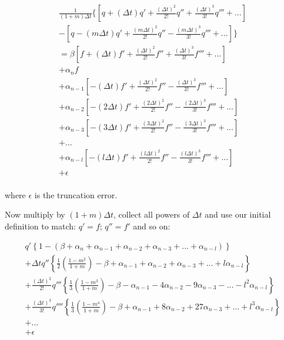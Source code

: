 \begin{multline}
\frac{1}{(1+m) \Delta t}
       \{ \left[ q +     ( \Delta t) q' +  \frac{( \Delta t)^2}    {2!} q'' +  \frac{(    \Delta t)^3}{3!} q''' + ... \right] \\
	- \left[ q - (m \Delta t) q'  + \frac{(m \Delta t)^2}{2!} q'' -    \frac{(m \Delta t)^3}{3!} q'''  + ...  \right] \}
	    \\
	= \beta \left[ f +  (\Delta t) f'   + \frac{(\Delta t)^2}{2!} f'' +  \frac{(\Delta t)^3}{3!} f'''            + ... \right]  \\    
	+ \alpha_n f \\
	+  \alpha_{n-1}  \left[ - (\Delta t) f'      +    \frac{(\Delta t)^2}   {2!} f'' -        \frac{( \Delta t)^3}{3!} f'''    + ... \right]    \\
	+  \alpha_{n-2}  \left[ - (2 \Delta t) f'  +    \frac{(2 \Delta t)^2}{2!} f'' -    \frac{(2 \Delta t)^3}{3!} f'''  + ...   \right]    \\
	+  \alpha_{n-3}  \left[ - (3 \Delta t) f'  +    \frac{(3 \Delta t)^2}{2!} f'' -    \frac{(3 \Delta t)^3}{3!} f'''  + ...  \right]    \\
	+ ... \\
	+  \alpha_{n-l}  \left[ - (l \Delta t) f'  +    \frac{(l \Delta t)^2}{2!} f'' -    \frac{(l \Delta t)^3}{3!} f''' + ...  \right]    \\	
	+  \epsilon \\
\end{multline}

where $\epsilon$ is the truncation error.

Now multiply by $(1+m) \Delta t$, collect all powers of $\Delta t$ and use our initial definition to match: $q'=f$; $q''=f'$ and so on:


\begin{multline}
q' \left\{1-(\beta +\alpha_n +\alpha_{n-1}+\alpha_{n-2}+\alpha_{n-3}+ ... +\alpha_{n-l})\right\}\\
+\Delta t q'' \left\{\frac{1}{2}\left(\frac{1-m^2}{1+m}\right)-\beta  +\alpha_{n-1}+\alpha_{n-2}+\alpha_{n-3}+ ... +l\alpha_{n-l}\right\} \\
+\frac{(\Delta t)^2}{2!} q''' \left\{\frac{1}{3}\left(\frac{1-m^3}{1+m}\right)-\beta  -\alpha_{n-1}-4\alpha_{n-2}-9\alpha_{n-3}- ... -l^2\alpha_{n-l}\right\}  \\
+\frac{(\Delta t)^3}{3!} q'''' \left\{\frac{1}{3}\left(\frac{1-m^4}{1+m}\right)-\beta  +\alpha_{n-1}+8\alpha_{n-2}+27\alpha_{n-3}+ ... +l^3\alpha_{n-l}\right\}  \\
+ ... \\
+  \epsilon \\
\label{discretisation-error}
\end{multline}

